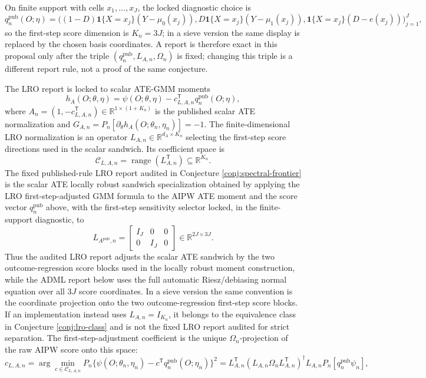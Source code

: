 \documentclass[11pt]{article}
\newcommand{\one}{\mathbf{1}}
\newcommand{\transpose}{\mathsf{T}}
\newcommand{\R}{\mathbb{R}}
\theoremstyle{definition}
\theoremstyle{plain}
\theoremstyle{remark}
\begin{document}
On finite support with cells \(x_1,\ldots,x_J\), the locked diagnostic choice is
\[
q^{\mathrm{pub}}_n(O;\eta)=
\bigl((1-D)\one\{X=x_j\}(Y-\mu_0(x_j)),
D\one\{X=x_j\}(Y-\mu_1(x_j)),
\one\{X=x_j\}(D-e(x_j))\bigr)_{j=1}^J,
\]
so the first-step score dimension is \(K_n=3J\); in a sieve version the same display is replaced by the chosen
basis coordinates.  A report is therefore exact in this proposal only after
the triple
\((q^{\mathrm{pub}}_n,L_{A,n},\Omega_n)\) is fixed; changing this triple is a
different report rule, not a proof of the same conjecture.

The LRO report is locked to scalar ATE-GMM moments
\[
h_A(O;\theta,\eta)=
\psi(O;\theta,\eta)-c_{L,A,n}^{\transpose}q^{\mathrm{pub}}_n(O;\eta),
\]
where \(A_n=(1,-c_{L,A,n}^{\transpose})\in\R^{1\times(1+K_n)}\) is the
published scalar ATE normalization and \(G_{A,n}=P_n[\partial_\theta
h_A(O;\theta_n,\eta_n)]=-1\).  The finite-dimensional LRO normalization is an
operator \(L_{A,n}\in\R^{d_A\times K_n}\) selecting the first-step score
directions used in the scalar sandwich.  Its coefficient space is
\[
\mathcal C_{L,A,n}=\operatorname{range}(L_{A,n}^{\transpose})\subseteq\R^{K_n}.
\]
The fixed published-rule LRO report audited in Conjecture
\ref{conj:spectral-frontier} is the scalar ATE locally robust sandwich
specialization obtained by applying the LRO first-step-adjusted GMM formula to
the AIPW ATE moment and the score vector \(q^{\mathrm{pub}}_n\) above, with
the first-step sensitivity selector locked, in the finite-support diagnostic,
to
\[
L_{A^{\mathrm{pub}},n}
=
\begin{bmatrix}
I_J&0&0\\
0&I_J&0
\end{bmatrix}
\in\R^{2J\times 3J}.
\]
Thus the audited LRO report adjusts the scalar ATE sandwich by the two
outcome-regression score blocks used in the locally robust moment
construction, while the ADML report below uses the full automatic
Riesz/debiasing normal equation over all \(3J\) score coordinates.  In a sieve
version the same convention is the coordinate projection onto the two
outcome-regression first-step score blocks.  If an implementation instead
uses \(L_{A,n}=I_{K_n}\), it belongs to the equivalence class in Conjecture
\ref{conj:lro-class} and is not the fixed LRO report audited for strict
separation.
The first-step-adjustment coefficient is the unique \(\Omega_n\)-projection of
the raw AIPW score onto this space:
\[
c_{L,A,n}
=\arg\min_{c\in\mathcal C_{L,A,n}}P_n\{\psi(O;\theta_n,\eta_n)-
c^{\transpose}q^{\mathrm{pub}}_n(O;\eta_n)\}^2
=L_{A,n}^{\transpose}(L_{A,n}\Omega_nL_{A,n}^{\transpose})^\dagger
L_{A,n}P_n[q^{\mathrm{pub}}_n\psi_n],
\]
\end{document}
